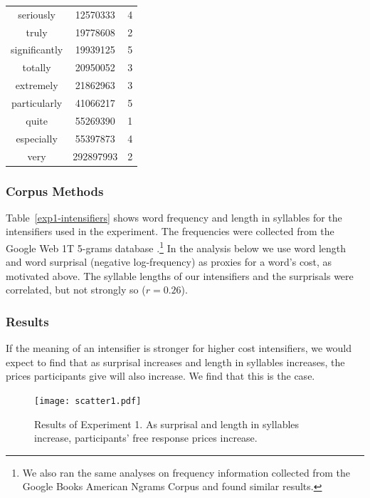 \documentclass[10pt,letterpaper]{article}
\newcommand{\todo}[1]{{\color{red}#1}}
\begin{document}
\begin{table}[ht]
\begin{center}
\begin{tabular}{ccc}
    seriously & 12570333 & 4 \\
    truly & 19778608 & 2 \\
    significantly & 19939125 & 5 \\
    totally & 20950052 & 3 \\
    extremely & 21862963 & 3 \\
    particularly & 41066217 & 5 \\
    quite & 55269390 & 1 \\
    especially & 55397873 & 4 \\
    very & 292897993 & 2
  \end{tabular}
 \end{center}
\end{table}

\subsubsection{Corpus Methods}

Table~\ref{exp1-intensifiers} shows word frequency and length in syllables for the intensifiers used in the experiment.
The frequencies were collected from the Google Web 1T 5-grams database \cite{web1t5gram}.\footnote{
  We also ran the same analyses on frequency information collected from the Google Books American Ngrams Corpus \cite{books2011} and found similar results.
}
In the analysis below we use word length and word surprisal (negative log-frequency) as proxies for a word's cost, as motivated above.
The syllable lengths of our intensifiers and the surprisals %
were correlated, but not strongly so ($r = 0.26$).

\subsubsection{Results}

If the meaning of an intensifier is stronger for higher cost intensifiers, we would expect to find that as surprisal increases and length in syllables increases, the prices participants give will also increase. We find that this is the case.


\begin{figure}[ht]
\begin{center}
\texttt{[image: scatter1.pdf]}
\end{center}
\caption{Results of Experiment 1. As surprisal and length in syllables increase, participants' free response prices increase.} 
\label{exp1-plot}
\end{figure}
\end{document}
